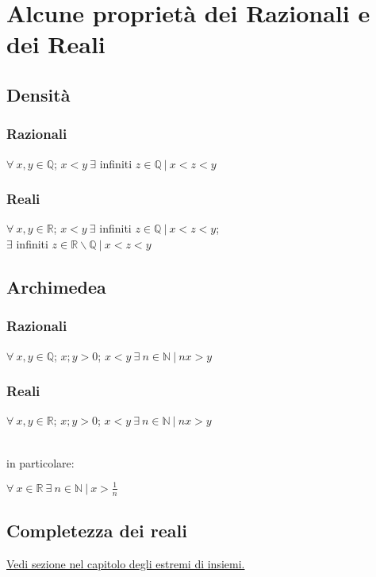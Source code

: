 \chapter{Alcune proprietà dei Razionali e dei Reali}
\section{Densità}
\subsection{Razionali}
\begin{Large}
$\forall\ x,y \in \mathbb{Q}$; $x<y\ \exists$ infiniti $z \in \mathbb{Q}\ |\ x<z<y$
\end{Large}
\subsection{Reali}
\begin{Large}
$\forall\ x,y \in \mathbb{R}$; $x<y\ \exists$ infiniti $z \in \mathbb{Q}\ |\ x<z<y$;\\
$\exists$ infiniti $z \in \mathbb{R} \backslash \mathbb{Q}\ |\ x<z<y$
\end{Large}

\section{Archimedea}
\subsection{Razionali}
\begin{Large}
$\forall\ x,y \in \mathbb{Q}$; $x;y > 0$; $x<y\ \exists\ n \in \mathbb{N}\ |\ nx>y$
\end{Large}
\subsection{Reali}
\begin{Large}
$\forall\ x,y \in \mathbb{R}$; $x;y > 0$; $x<y\ \exists\ n \in \mathbb{N}\ |\ nx>y$
\end{Large}\\
in particolare:\\
\begin{Large}
$\forall\ x \in \mathbb{R}\ \exists\ n \in \mathbb{N}\ |\ x>\frac{1}{n}$
\end{Large}

\section{Completezza dei reali}
\hyperref[sec: CompletezzaReali]{\color{cyan}Vedi sezione nel capitolo degli estremi di insiemi.}